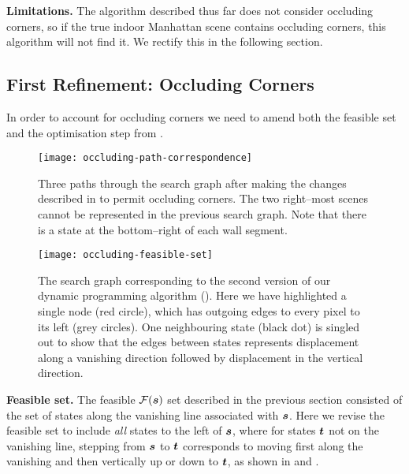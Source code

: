 \textbf{Limitations.} The algorithm described thus far does not
consider occluding corners, so if the true indoor Manhattan scene
contains occluding corners, this algorithm will not find it. We
rectify this in the following section.

\subsection{First Refinement: Occluding Corners}
\label{sec:amended-alg}

In order to account for occluding corners we need to amend both the
feasible set and the optimisation step from .

\begin{figure}[tb]
  \centering
  \texttt{[image: occluding-path-correspondence]}
  \caption{Three paths through the search graph after making the
    changes described in  to permit occluding
    corners. The two right--most scenes cannot be represented in the
    previous search graph. Note that there is a state at the
    bottom--right of each wall segment.}
  \label{fig:occluding-path-correspondence}
\end{figure}

\begin{figure}[tb]
  \centering
  \texttt{[image: occluding-feasible-set]}
  \caption{The search graph corresponding to the second version of our
    dynamic programming algorithm (). Here we
    have highlighted a single node (red circle), which has outgoing
    edges to every pixel to its left (grey circles). One neighbouring
    state (black dot) is singled out to show that the edges between
    states represents displacement along a vanishing direction
    followed by displacement in the vertical direction.}
  \label{fig:occluding-feasible-set}
\end{figure}

\textbf{Feasible set.} The feasible $\FeasibleSet(\State)$ set
described in the previous section consisted of the set of states along
the vanishing line associated with $\State$. Here we revise the
feasible set to include \textit{all} states to the left of $\State$,
where for states $\OtherState$ not on the vanishing line, stepping
from $\State$ to $\OtherState$ corresponds to moving first along the
vanishing and then vertically up or down to $\OtherState$, as shown in
 and
.

